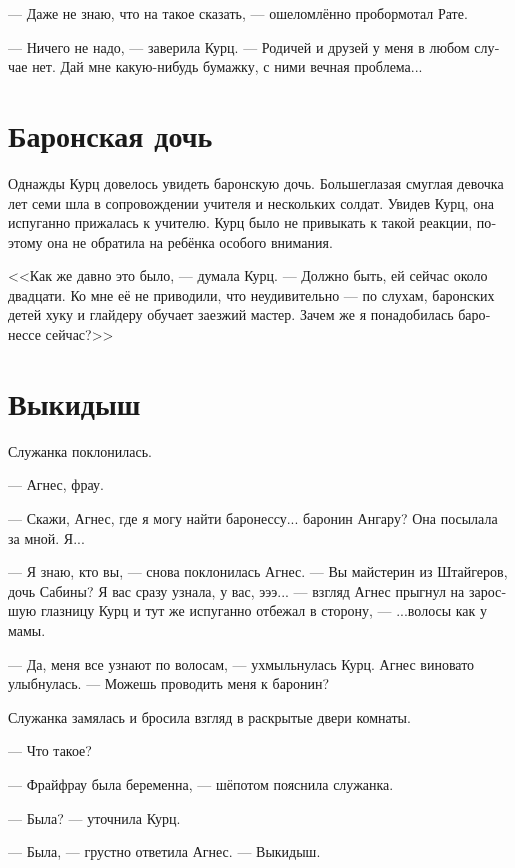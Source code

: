 \documentclass[a4paper,12pt,fleqn]{book}\usepackage{polyglossia}\setdefaultlanguage[babelshorthands=true]{russian}\setotherlanguage{english}\defaultfontfeatures{Ligatures=TeX,Mapping=tex-text}\usepackage{xcolor}\newcommand{\ml}[3]{#2}
\begin{document}
--- Даже не знаю, что на такое сказать, --- ошеломлённо пробормотал Рате.

--- Ничего не надо, --- заверила Курц.
--- Родичей и друзей у меня в любом случае нет.
Дай мне какую-нибудь бумажку, с ними вечная проблема...

\section{Баронская дочь}

Однажды Курц довелось увидеть баронскую дочь.
Большеглазая смуглая девочка лет семи шла в сопровождении учителя и нескольких солдат.
Увидев Курц, она испуганно прижалась к учителю.
Курц было не привыкать к такой реакции, поэтому она не обратила на ребёнка особого внимания.

<<Как же давно это было, --- думала Курц.
--- Должно быть, ей сейчас около двадцати.
Ко мне её не приводили, что неудивительно --- по слухам, баронских детей хуку и глайдеру обучает заезжий мастер.
Зачем же я понадобилась баронессе сейчас?>>

\section{Выкидыш}

Служанка поклонилась.

--- Агнес, фрау.

--- Скажи, Агнес, где я могу найти баронессу... баронин Ангару?
Она посылала за мной.
Я...

--- Я знаю, кто вы, --- снова поклонилась Агнес.
\ml{$0$}
{--- Вы майстерин из Штайгеров, дочь Сабины?}
{``You're the \textit{meisterin}, Steiger kin, Sabina's daughter?}
Я вас сразу узнала, у вас, эээ... --- взгляд Агнес прыгнул на заросшую глазницу Курц и тут же испуганно отбежал в сторону, --- ...волосы как у мамы.

--- Да, меня все узнают по волосам, --- ухмыльнулась Курц.
Агнес виновато улыбнулась.
--- Можешь проводить меня к баронин?

Служанка замялась и бросила взгляд в раскрытые двери комнаты.

--- Что такое?

\ml{$0$}
{--- Фрайфрау была беременна, --- шёпотом пояснила служанка.}
{``Freifrau was pregnant,'' the servant quietly explained.}

\ml{$0$}
{--- Была? --- уточнила Курц.}
{``Was?'' Kurz asked.}

--- Была, --- грустно ответила Агнес.
\ml{$0$}
{--- Выкидыш.}
{``She lost the baby.''}
\end{document}
